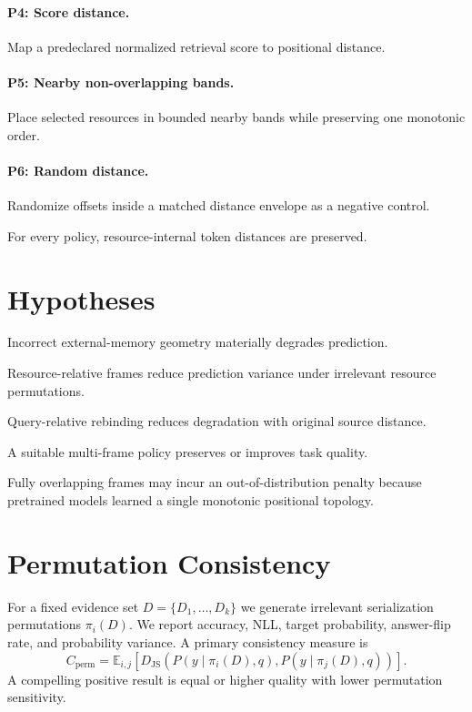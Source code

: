 \documentclass[10pt]{article}
\begin{document}
\paragraph{P4: Score distance.}
Map a predeclared normalized retrieval score to positional distance.

\paragraph{P5: Nearby non-overlapping bands.}
Place selected resources in bounded nearby bands while preserving one monotonic order.

\paragraph{P6: Random distance.}
Randomize offsets inside a matched distance envelope as a negative control.

For every policy, resource-internal token distances are preserved.

\section{Hypotheses}
\begin{description}[leftmargin=1.7cm,style=nextline]
\item[H1] Incorrect external-memory geometry materially degrades prediction.
\item[H2] Resource-relative frames reduce prediction variance under irrelevant resource permutations.
\item[H3] Query-relative rebinding reduces degradation with original source distance.
\item[H4] A suitable multi-frame policy preserves or improves task quality.
\item[H5] Fully overlapping frames may incur an out-of-distribution penalty because pretrained models learned a single monotonic positional topology.
\end{description}

\section{Permutation Consistency}
For a fixed evidence set $D=\{D_1,\ldots,D_k\}$ we generate irrelevant serialization permutations $\pi_i(D)$. We report accuracy, NLL, target probability, answer-flip rate, and probability variance. A primary consistency measure is
\[
C_{\mathrm{perm}}=
\mathbb{E}_{i,j}
\left[
D_{\mathrm{JS}}
\left(
P(y\mid\pi_i(D),q),
P(y\mid\pi_j(D),q)
\right)
\right].
\]
A compelling positive result is equal or higher quality with lower permutation sensitivity.
\end{document}
